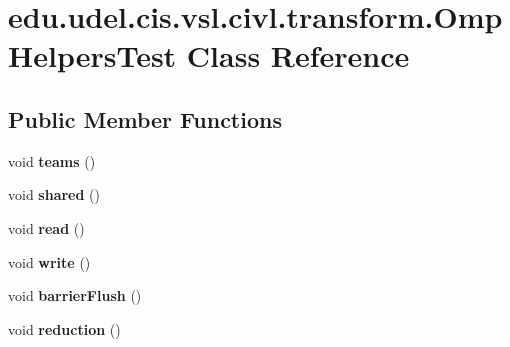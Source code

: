 \hypertarget{classedu_1_1udel_1_1cis_1_1vsl_1_1civl_1_1transform_1_1OmpHelpersTest}{}\section{edu.\+udel.\+cis.\+vsl.\+civl.\+transform.\+Omp\+Helpers\+Test Class Reference}
\label{classedu_1_1udel_1_1cis_1_1vsl_1_1civl_1_1transform_1_1OmpHelpersTest}
\subsection*{Public Member Functions}
\begin{DoxyCompactItemize}
\item 
\hypertarget{classedu_1_1udel_1_1cis_1_1vsl_1_1civl_1_1transform_1_1OmpHelpersTest_a02f6bc9a472f9e7c3de15c75fac56406}{}void {\bfseries teams} ()\label{classedu_1_1udel_1_1cis_1_1vsl_1_1civl_1_1transform_1_1OmpHelpersTest_a02f6bc9a472f9e7c3de15c75fac56406}

\item 
\hypertarget{classedu_1_1udel_1_1cis_1_1vsl_1_1civl_1_1transform_1_1OmpHelpersTest_aedc33fedb5b647423f55278c72c182cd}{}void {\bfseries shared} ()\label{classedu_1_1udel_1_1cis_1_1vsl_1_1civl_1_1transform_1_1OmpHelpersTest_aedc33fedb5b647423f55278c72c182cd}

\item 
\hypertarget{classedu_1_1udel_1_1cis_1_1vsl_1_1civl_1_1transform_1_1OmpHelpersTest_ad63c7769638d16a9992f2bd5e7b33a1f}{}void {\bfseries read} ()\label{classedu_1_1udel_1_1cis_1_1vsl_1_1civl_1_1transform_1_1OmpHelpersTest_ad63c7769638d16a9992f2bd5e7b33a1f}

\item 
\hypertarget{classedu_1_1udel_1_1cis_1_1vsl_1_1civl_1_1transform_1_1OmpHelpersTest_aa73ed14cde438c0c1632695dad896163}{}void {\bfseries write} ()\label{classedu_1_1udel_1_1cis_1_1vsl_1_1civl_1_1transform_1_1OmpHelpersTest_aa73ed14cde438c0c1632695dad896163}

\item 
\hypertarget{classedu_1_1udel_1_1cis_1_1vsl_1_1civl_1_1transform_1_1OmpHelpersTest_a54d8ae20f6996180f89b6d7c2df88945}{}void {\bfseries barrier\+Flush} ()\label{classedu_1_1udel_1_1cis_1_1vsl_1_1civl_1_1transform_1_1OmpHelpersTest_a54d8ae20f6996180f89b6d7c2df88945}

\item 
\hypertarget{classedu_1_1udel_1_1cis_1_1vsl_1_1civl_1_1transform_1_1OmpHelpersTest_a2333aa6e73fc522a8ad711ec11c69a53}{}void {\bfseries reduction} ()\label{classedu_1_1udel_1_1cis_1_1vsl_1_1civl_1_1transform_1_1OmpHelpersTest_a2333aa6e73fc522a8ad711ec11c69a53}


\end{DoxyCompactItemize}
